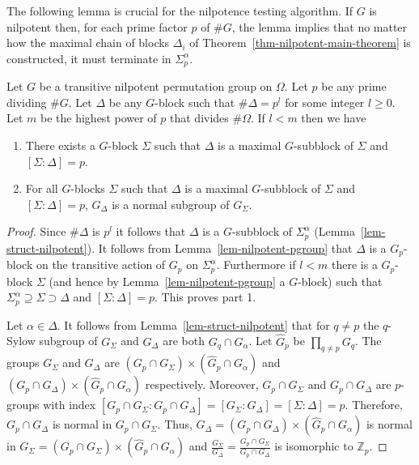 \documentclass{llncs}
\begin{document}
The following lemma is crucial for the nilpotence testing algorithm.
If $G$ is nilpotent then, for each prime factor $p$ of $\# G$, the
lemma implies that no matter how the maximal chain of blocks
$\Delta_i$ of Theorem~\ref{thm-nilpotent-main-theorem} is constructed,
it must terminate in $\Sigma^{\alpha}_p$.

\begin{lemma}\label{lem-nilpotent-block-increment}
  Let $G$ be a transitive nilpotent permutation group on $\Omega$. Let
  $p$ be any prime dividing $\# G$. Let $\Delta$ be any $G$-block such
  that $\# \Delta = p^l$ for some integer $l \geq 0$. Let $m$ be the
  highest power of $p$ that divides $\# \Omega$. If $l < m$ then we
  have
  \begin{enumerate}
  \item There exists a $G$-block $\Sigma$ such that $\Delta$ is a
    maximal $G$-subblock of $\Sigma$ and $[\Sigma: \Delta] = p$.
  \item For all $G$-blocks $\Sigma$ such that $\Delta$ is a maximal
    $G$-subblock of $\Sigma$ and $[\Sigma: \Delta] = p$, $G_\Delta$ is
    a normal subgroup of $G_\Sigma$.
  \end{enumerate}
\end{lemma}
\begin{proof}
  Since $\# \Delta$ is $p^l$ it follows that $\Delta$ is a
  $G$-subblock of $\Sigma_p^\alpha$
  (Lemma~\ref{lem-struct-nilpotent}). It follows from
  Lemma~\ref{lem-nilpotent-pgroup} that $\Delta$ is a $G_p$-block on
  the transitive action of $G_p$ on $\Sigma_p^\alpha$. Furthermore if
  $l < m$ there is a $G_p$-block $\Sigma$ (and hence by
  Lemma~\ref{lem-nilpotent-pgroup} a $G$-block) such that
  $\Sigma_p^\alpha \supseteq \Sigma \supset \Delta$ and $[\Sigma :
  \Delta] = p$. This proves part 1.

  Let $\alpha\in\Delta$. It follows {from}
  Lemma~\ref{lem-struct-nilpotent} that for $q \neq p$ the $q$-Sylow
  subgroup of $G_\Sigma$ and $G_\Delta$ are both $G_q \cap G_\alpha$.
  Let $\widehat{G}_p$ be $\prod_{q \neq p} G_q$. The groups $G_\Sigma$
  and $G_\Delta$ are $(G_p \cap G_\Sigma) \times (\widehat{G}_p \cap
  G_\alpha)$ and $(G_p \cap G_\Delta) \times (\widehat{G}_p \cap
  G_\alpha)$ respectively. Moreover, $G_p \cap G_\Sigma$ and $G_p \cap
  G_\Delta$ are $p$-groups with index $[G_p \cap G_\Sigma : G_p \cap
  G_\Delta] = [G_\Sigma : G_\Delta] = [\Sigma : \Delta] = p$.
  Therefore, $G_p \cap G_\Delta$ is normal in $G_p \cap G_\Sigma$.
  Thus, $G_\Delta = (G_p \cap G_\Delta)\times (\widehat{G}_p \cap
  G_\alpha)$ is normal in $G_\Sigma = (G_p \cap G_\Sigma) \times
  (\widehat{G}_p \cap G_\alpha)$ and $\frac{G_\Sigma}{G_\Delta} =
  \frac{G_p \cap G_\Sigma}{G_p \cap G_\Delta}$ is isomorphic to
  $\mathbb{Z}_p$.
  \end{proof}
\end{document}
